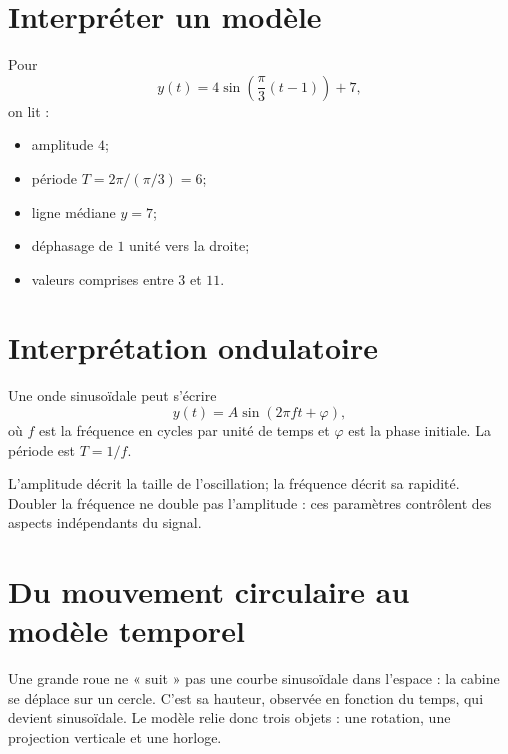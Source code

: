 \documentclass[12pt,a4paper,openany]{book}
\begin{document}
\section{Interpréter un modèle}

\begin{examplebox}
Pour
\[
y(t)=4\sin\left(\frac\pi3(t-1)\right)+7,
\]
on lit :
\begin{itemize}
\item amplitude $4$;
\item période $T=2\pi/(\pi/3)=6$;
\item ligne médiane $y=7$;
\item déphasage de $1$ unité vers la droite;
\item valeurs comprises entre $3$ et $11$.
\end{itemize}
\end{examplebox}

\section{Interprétation ondulatoire}

Une onde sinusoïdale peut s'écrire
\[
y(t)=A\sin(2\pi ft+\varphi),
\]
où $f$ est la fréquence en cycles par unité de temps et $\varphi$ est la phase initiale. La période est $T=1/f$.

\begin{intuitionbox}
L'amplitude décrit la taille de l'oscillation; la fréquence décrit sa rapidité. Doubler la fréquence ne double pas l'amplitude : ces paramètres contrôlent des aspects indépendants du signal.
\end{intuitionbox}


\section{Du mouvement circulaire au modèle temporel}

\begin{visualbox}
Une grande roue ne « suit » pas une courbe sinusoïdale dans l'espace : la cabine se déplace sur un cercle. C'est sa hauteur, observée en fonction du temps, qui devient sinusoïdale. Le modèle relie donc trois objets : une rotation, une projection verticale et une horloge.
\end{visualbox}
\end{document}

